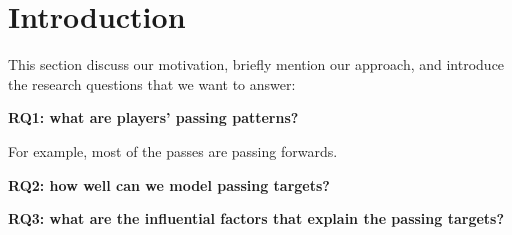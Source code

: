 \section{Introduction} \label{intro}
This section discuss our motivation, briefly mention our approach, and introduce the research questions that we want to answer:
\begin{description}
	\item \textbf{RQ1: what are players' passing patterns?}
	
	For example, most of the passes are passing forwards.
	
	\item \textbf{RQ2: how well can we model passing targets?}
	\item \textbf{RQ3: what are the influential factors that explain the passing targets?}
\end{description}